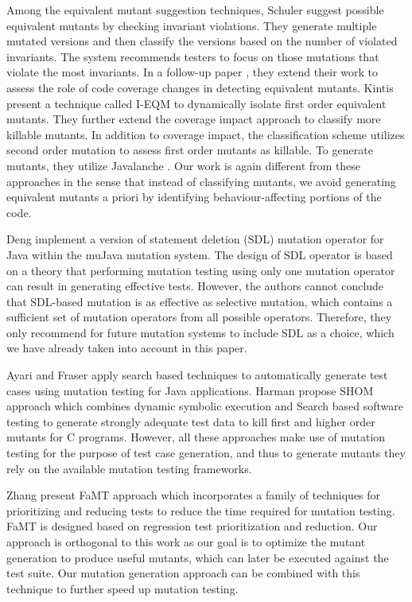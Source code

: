Among the equivalent mutant suggestion techniques, Schuler \etal \cite{schuler:issta09} suggest possible equivalent mutants by checking invariant violations. They
generate multiple mutated versions and then classify the versions based on the number of violated invariants.
The system recommends testers to focus on those mutations that violate the most invariants.
In a follow-up paper \cite{schuler:tvr12}, they extend their work to assess the role of code coverage changes in detecting equivalent mutants. 
Kintis \etal \cite{kintis:icst12} present a technique called I-EQM to dynamically isolate first order equivalent mutants. They
further extend the coverage impact approach \cite{schuler:tvr12} to classify more killable mutants.  
In addition to coverage impact, the classification scheme utilizes second order mutation to assess first order mutants as killable. 
To generate mutants, they utilize Javalanche \cite{schuler:tvr12}.
Our work is again different from these approaches in the sense that instead of classifying mutants, 
we avoid generating equivalent mutants a priori by identifying behaviour-affecting portions of the code.

Deng \etal \cite{deng:icst13} implement a version of statement deletion (SDL) mutation operator for Java within the muJava mutation system. The design of SDL operator is based on a theory that performing mutation testing using only one mutation operator can result in generating effective tests. However, the authors cannot conclude that SDL-based mutation is as effective as selective mutation, which contains a sufficient set of mutation operators from all possible operators. Therefore, they only recommend for future mutation systems to include SDL as a choice, which we have already taken into account in this paper.  

Ayari \etal \cite{ayari:gecco07} and Fraser \etal \cite{fraser:tse12} apply search based techniques to automatically generate test cases using mutation testing for Java applications. Harman \etal \cite{harman:fse11} propose SHOM approach which combines dynamic symbolic execution and Search based software testing to generate strongly adequate test data to kill first and higher order mutants for C programs. However, all these approaches make use of mutation testing for the purpose of test case generation, and thus to generate mutants they rely on the available mutation testing frameworks.

Zhang \etal \cite{zhang:issta13} present FaMT approach which incorporates a family
of techniques for prioritizing and reducing tests to reduce the time required for mutation
testing. FaMT is designed based on regression test prioritization and reduction. Our approach is orthogonal to this work as our goal is to optimize the mutant generation to produce useful mutants, which can later be executed against the test suite.
Our mutation generation approach can be combined with this technique to further speed up mutation testing.

